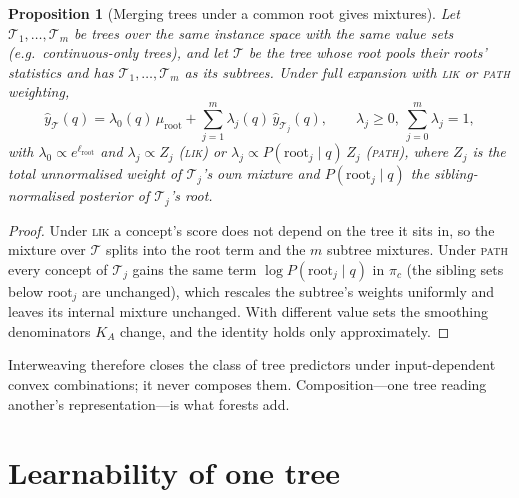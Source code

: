 \documentclass[11pt]{article}
\newtheorem{proposition}[theorem]{Proposition}
\theoremstyle{definition}
\theoremstyle{remark}
\newcommand{\T}{\mathcal{T}}
\newcommand{\hy}{\hat{y}}
\begin{document}
\begin{proposition}[Merging trees under a common root gives mixtures]\label{prop:interweave}
Let $\T_1,\dots,\T_m$ be trees over the same instance space with the same value sets
(e.g.\ continuous-only trees), and let $\T$ be the tree whose root pools their roots'
statistics and has $\T_1,\dots,\T_m$ as its subtrees.  Under full expansion with
\textsc{lik} or \textsc{path} weighting,
\[
  \hy_\T(q)=\lambda_0(q)\,\mu_{\text{root}}+\sum_{j=1}^m\lambda_j(q)\,\hy_{\T_j}(q),
  \qquad\lambda_j\ge0,\ \sum_{j=0}^m\lambda_j=1,
\]
with $\lambda_0\propto e^{\ell_{\text{root}}}$ and $\lambda_j\propto Z_j$ (\textsc{lik})
or $\lambda_j\propto P(\text{root}_j\mid q)\,Z_j$ (\textsc{path}), where $Z_j$ is the
total unnormalised weight of $\T_j$'s own mixture and $P(\text{root}_j\mid q)$ the
sibling-normalised posterior of $\T_j$'s root.
\end{proposition}
\begin{proof}
Under \textsc{lik} a concept's score does not depend on the tree it sits in, so the
mixture over $\T$ splits into the root term and the $m$ subtree mixtures.  Under
\textsc{path} every concept of $\T_j$ gains the same term $\log P(\text{root}_j\mid q)$
in $\pi_c$ (the sibling sets below $\text{root}_j$ are unchanged), which rescales the
subtree's weights uniformly and leaves its internal mixture unchanged.  With different
value sets the smoothing denominators $K_A$ change, and the identity holds only
approximately.
\end{proof}

Interweaving therefore closes the class of tree predictors under input-dependent
convex combinations; it never composes them.  Composition---one tree reading another's
representation---is what forests add.

\section{Learnability of one tree}\label{sec:learn}
\end{document}
